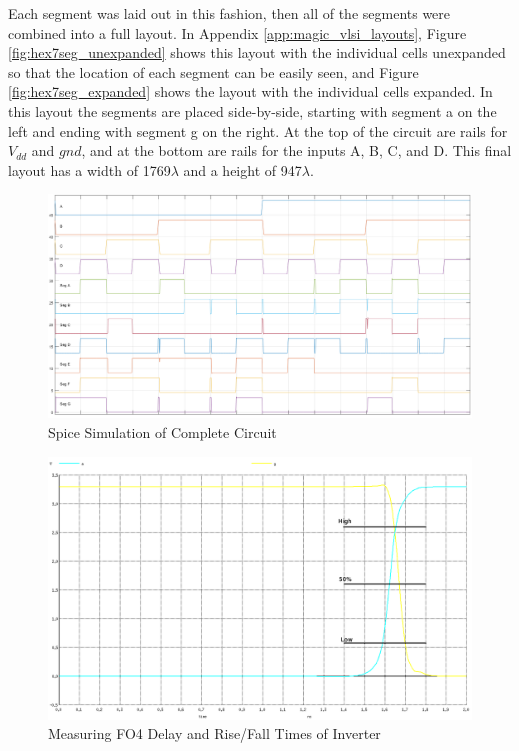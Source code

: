 \documentclass[12pt]{article}
\begin{document}
Each segment was laid out in this fashion, then all of the segments were combined into a full layout.
In Appendix \ref{app:magic_vlsi_layouts}, Figure \ref{fig:hex7seg_unexpanded} shows this layout with the individual cells unexpanded so that the location of each segment can be easily seen, and Figure \ref{fig:hex7seg_expanded} shows the layout with the individual cells expanded.
In this layout the segments are placed side-by-side, starting with segment a on the left and ending with segment g on the right.
At the top of the circuit are rails for \(V_{dd}\) and \(gnd\), and at the bottom are rails for the inputs A, B, C, and D.
This final layout has a width of 1769\(\lambda\) and a height of 947\(\lambda\).

\begin{figure}[H]
	\centering
	\includegraphics[width=\textwidth, keepaspectratio]{Graphics/7seg.png}
	\caption{Spice Simulation of Complete Circuit}
	\label{}
\end{figure}

\begin{figure}[H]
	\centering
	\includegraphics[width=\textwidth, keepaspectratio]{Graphics/FO4_Delay}
	\caption{Measuring FO4 Delay and Rise/Fall Times of Inverter}
	\label{fig:delay_rise_fall}
\end{figure}
\end{document}
